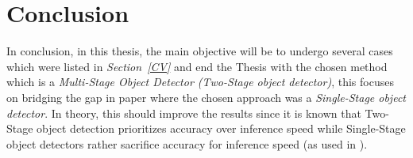 \documentclass[12pt]{extarticle}
\begin{document}
	\newpage	
	\section{Conclusion}
	In conclusion, in this thesis, the main objective will be to undergo several cases which were listed in \emph{Section~\ref{CV}} and end the Thesis with the chosen method which is a \emph{Multi-Stage Object Detector (Two-Stage object detector)}, this focuses on bridging the gap in paper \cite{one_shot} where the chosen approach was a \emph{Single-Stage object detector}. In theory, this should improve the results since it is known that Two-Stage object detection prioritizes accuracy over inference speed while Single-Stage object detectors rather sacrifice accuracy for inference speed (as used in \cite{one_shot}). 
	\newpage

	
	
	
	
\end{document}
